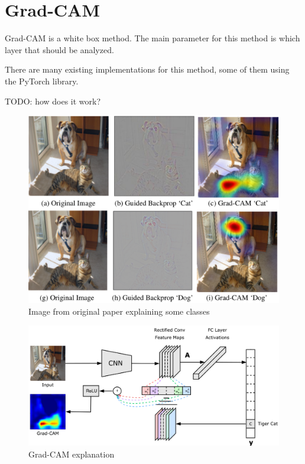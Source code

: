 \section{Grad-CAM}
Grad-CAM is a white box method. The main parameter for this method is which layer that should be analyzed.

There are many existing implementations for this method, some of them using the PyTorch library.

TODO: how does it work?


\begin{figure}[h]
\centering
\caption{Image from original paper explaining some classes}
\includegraphics[width=14cm]{chapters/02_methods/images/grad-cam-example.png}
\end{figure}

\begin{figure}[h]
\centering
\caption{Grad-CAM explanation}
\includegraphics[width=14cm]{chapters/02_methods/images/grad-cam.png}
\end{figure}
